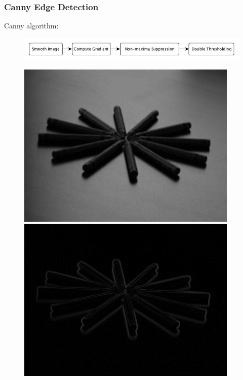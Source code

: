 \documentclass[notheorems,serif,table,compress]{beamer}  %
\begin{document}
\begin{frame}
\frametitle{Canny Edge Detection}
{\color{blue}Canny algorithm:}
    \begin{figure}
        \includegraphics[width=1\linewidth]{cannyliu.jpg} 
    \end{figure}
    \begin{figure}
        \begin{minipage}[t]{0.22\linewidth}
            \includegraphics[width=1\linewidth]{gauSmooth.png} 
        \end{minipage}
        \begin{minipage}[t]{0.22\linewidth}
            \includegraphics[width=1\linewidth]{gradResult.png} 

\end{minipage}
\end{figure}
\end{frame}
\end{document}
